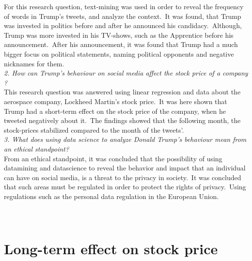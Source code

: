 \documentclass[12pt]{article}
\begin{document}
For this research question, text-mining was used in order to reveal the frequency of words in Trump's tweets, and analyze the context.\ It was found, that Trump was invested in politics before and after he announced his candidacy.\ Although, Trump was more invested in his TV-shows, such as the Apprentice before his announcement.\ After his announcement, it was found that Trump had a much bigger focus on political statements, naming political opponents and negative nicknames for them.\ \\

\textit{2. How can Trump's behaviour on social media affect the stock price of a company ?} \\

This research question was answered using linear regression and data about the aerospace company, Lockheed Martin's stock price.\ It was here shown that Trump had a short-term effect on the stock price of the company, when he tweeted negatively about it.\ The findings showed that the following month, the stock-prices stabilized compared to the month of the tweets'.\\


\textit{3. What does using data science to analyze Donald Trump's behaviour mean from an ethical standpoint?}\\
 
From an ethical standpoint, it was concluded that the possibility of using datamining and datascience to reveal the behavior and impact that an individual can have on social media, is a threat to the privacy in society.\ It was concluded that such areas must be regulated in order to protect the rights of privacy.\ Using regulations such as the personal data regulation in the European Union.  


\cleardoublepage





\cleardoublepage

\appendix



\section{\\Long-term effect on stock price}
\end{document}
